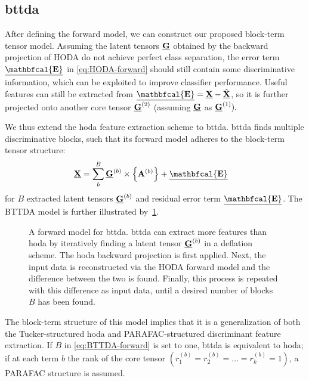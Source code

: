 \subsection{\Acl{bttda}}
After defining the forward model, we can construct our proposed block-term
tensor model.
Assuming the latent tensors $\underline{\mathbf{G}}$
obtained by the backward projection of HODA do not achieve perfect
class separation, the error term $\ten{\mathbfcal{E}}$ in
\cref{eq:HODA-forward} should still contain some discriminative
information, which can be exploited to improve classifier
performance.
Useful features can still be extracted from $\ten{\mathbfcal{E}} = \ten{X} -
\hat{\ten{X}}$, so it is further projected onto another core tensor
$\underline{\mathbf{G}}^{(2)}$ (assuming $\underline{\mathbf{G}}$ as $\underline{\mathbf{G}}^{(1)}).$

We thus extend the \ac{hoda} feature extraction scheme to \acf{bttda}.
\Ac{bttda} finds multiple discriminative blocks, such that its forward
model adheres to the block-term tensor structure:
\begin{align}
	\ten{X} & = \sum_b^B\ten{G}^{(b)}\mmpr{\mat{A}^{(b)}} + \ten{\mathbfcal{E}}
	\label{eq:BTTDA-forward}
\end{align}
for $B$ extracted latent tensors $\underline{\mathbf{G}}^{(b)}$ and residual error term
$\ten{\mathbfcal{E}}$.
The BTTDA model is further illustrated by~\cref{fig:BTTDA}.
\begin{figure}[t]
	\centering
	
  \caption[A forward model for \acs{bttda}.]{A forward model for \acf{bttda}.
    \Ac{bttda} can extract more features
    than \ac{hoda} by iteratively finding a latent tensor $\underline{\mathbf{G}}^{(b)}$ in a
		deflation scheme.
    The \ac{hoda} backward projection is first applied. Next, the
		input data is reconstructed via the HODA forward model and the
		difference between the two is found.
		Finally, this process is repeated with this difference as input data, until a
		desired number of blocks $B$ has been found.}
	\label{fig:BTTDA}
\end{figure}
The block-term structure of this model implies that it is a generalization of both
the Tucker-structured \ac{hoda} and PARAFAC-structured discriminant feature
extraction.
If $B$ in \cref{eq:BTTDA-forward} is set to one, \ac{bttda} is equivalent to
\ac{hoda}; if at each term $b$ the rank of the core tensor
$(r_1^{(b)}=r_2^{(b)}=\ldots=r_k^{(b)}=1)$, a PARAFAC structure is assumed.

